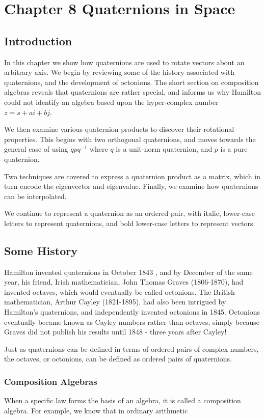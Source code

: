 \documentclass[10pt]{article}
\begin{document}
\section{Chapter 8
Quaternions in Space}
\subsection{Introduction}
In this chapter we show how quaternions are used to rotate vectors about an arbitrary axis. We begin by reviewing some of the history associated with quaternions, and the development of octonions. The short section on composition algebras reveals that quaternions are rather special, and informs us why Hamilton could not identify an algebra based upon the hyper-complex number $z=s+a i+b j$.

We then examine various quaternion products to discover their rotational properties. This begins with two orthogonal quaternions, and moves towards the general case of using $q p q^{-1}$ where $q$ is a unit-norm quaternion, and $p$ is a pure quaternion.

Two techniques are covered to express a quaternion product as a matrix, which in turn encode the eigenvector and eigenvalue. Finally, we examine how quaternions can be interpolated.

We continue to represent a quaternion as an ordered pair, with italic, lower-case letters to represent quaternions, and bold lower-case letters to represent vectors.

\subsection{Some History}
Hamilton invented quaternions in October 1843 , and by December of the same year, his friend, Irish mathematician, John Thomas Graves (1806-1870), had invented octaves, which would eventually be called octonions. The British mathematician, Arthur Cayley (1821-1895), had also been intrigued by Hamilton's quaternions, and independently invented octonions in 1845. Octonions eventually became known as Cayley numbers rather than octaves, simply because Graves did not publish his results until 1848 - three years after Cayley!

Just as quaternions can be defined in terms of ordered pairs of complex numbers, the octaves, or octonions, can be defined as ordered pairs of quaternions.

\subsubsection{Composition Algebras}
When a specific law forms the basis of an algebra, it is called a composition algebra. For example, we know that in ordinary arithmetic
\end{document}
